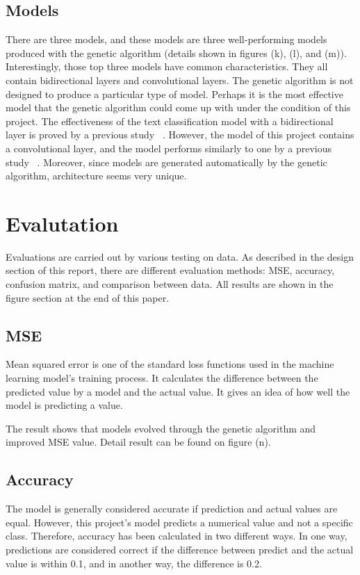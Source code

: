 \documentclass[11pt, natbib=false]{article}
\begin{document}
\subsection{Models}
There are three models, and these models are three well-performing models produced with the genetic algorithm (details shown in figures (k), (l), and (m)).
Interestingly, those top three models have common characteristics.
They all contain bidirectional layers and convolutional layers. The genetic algorithm is not designed to produce a particular type of model.
Perhaps it is the most effective model that the genetic algorithm could come up with under the condition of this project.
The effectiveness of the text classification model with a bidirectional layer is proved by a previous study ~\cite{hada2021ruddit}. However, the model of this project contains a convolutional layer, and the model performs similarly to one by a previous study ~\cite{hada2021ruddit}.
Moreover, since models are generated automatically by the genetic algorithm, architecture seems very unique.

\section{Evalutation}
Evaluations are carried out by various testing on data.
As described in the design section of this report, there are different evaluation methods: MSE, accuracy, confusion matrix, and comparison between data.
All results are shown in the figure section at the end of this paper.

\subsection{MSE}
Mean squared error is one of the standard loss functions used in the machine learning model's training process.
It calculates the difference between the predicted value by a model and the actual value.
It gives an idea of how well the model is predicting a value.

The result shows that models evolved through the genetic algorithm and improved MSE value.
Detail result can be found on figure (n).

\subsection{Accuracy}
The model is generally considered accurate if prediction and actual values are equal.
However, this project's model predicts a numerical value and not a specific class.
Therefore, accuracy has been calculated in two different ways.
In one way, predictions are considered correct if the difference between predict and the actual value is within 0.1, and in another way, the difference is 0.2.
\end{document}
